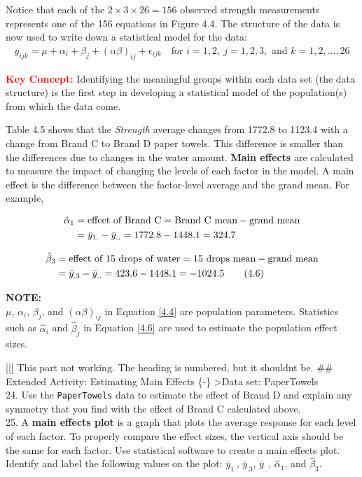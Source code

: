 \documentclass[
]{report}
\begin{document}
Notice that each of the \(2 \times 3 \times 26 = 156\) observed strength measurements represents one of the 156 equations in Figure 4.4. The structure of the data is now used to write down a statistical model for the data:
\begin{align}\label{4.5}
y_{ijk} = \mu + \alpha_i + \beta_j + (\alpha\beta)_{ij} + \epsilon_{ijk} \quad \text{for } i = 1,2,\ j = 1,2,3, \text{ and } k = 1,2,\ldots,26 \tag{4.5}
\end{align}

\large

\textbf{\textcolor{red}{Key Concept:}}
\color{red}
Identifying the meaningful groups within each data set (the data structure) is the first step in developing a statistical model of the population(s) from which the data come.
\color{black}
\normalsize

Table 4.5 shows that the \emph{Strength} average changes from 1772.8 to 1123.4 with a change from Brand C to Brand D paper towels. This difference is smaller than the differences due to changes in the water amount. \textbf{Main effects} are calculated to measure the impact of changing the levels of each factor in the model. A main effect is the difference between the factor-level average and the grand mean. For example,

\begin{align}
\hat{\alpha}_1 &= \text{effect of Brand C} = \text{Brand C mean} - \text{grand mean} \notag \\
&= \bar{y}_{1.} - \bar{y}_{..} = 1772.8 - 1448.1 = 324.7 \notag
\end{align}

\begin{align}\label{4.6}
\hat{\beta}_3 &= \text{effect of 15 drops of water} = \text{15 drops mean} - \text{grand mean} \notag \\
&= \bar{y}_{.3} - \bar{y}_{..} = 423.6 - 1448.1 = -1024.5 \tag{4.6}
\end{align}

\large

\textbf{NOTE:}\\
\(\mu\), \(\alpha_i\), \(\beta_j\), and \((\alpha\beta)_{ij}\) in Equation \ref{4.4} are population parameters. Statistics such as \(\hat{\alpha}_i\) and \(\hat{\beta}_j\) in Equation \ref{4.6} are used to estimate the population effect sizes.
\normalsize

{[}{[}{[} This part not working. The heading is numbered, but it shouldnt be.
\#\# Extended Activity: Estimating Main Effects \{‑\}
\textgreater Data set: PaperTowels\\
24. Use the \texttt{PaperTowels} data to estimate the effect of Brand D and explain any symmetry that you find with the effect of Brand C calculated above.\\
25. A \textbf{main effects plot} is a graph that plots the average response for each level of each factor. To properly compare the effect sizes, the vertical axis should be the same for each factor. Use statistical software to create a main effects plot. Identify and label the following values on the plot: \(\bar{y}_{1.}\), \(\bar{y}_{.3}\), \(\bar{y}_{..}\), \(\hat{\alpha}_1\), and \(\hat{\beta}_3\).
\end{document}
